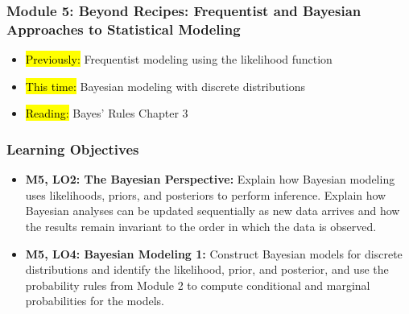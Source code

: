 
\begin{frame}
    \frametitle{Module 5: Beyond Recipes: Frequentist and Bayesian Approaches to Statistical Modeling}
    \begin{itemize}
        \item \hl{Previously: }Frequentist modeling using the likelihood function
        \item \hl{This time: }Bayesian modeling with discrete distributions
        \item \hl{Reading: }Bayes' Rules Chapter 3
    \end{itemize}

\end{frame}
\begin{frame}
    \frametitle{Learning Objectives}
    \begin{itemize}
        \item \textbf{M5, LO2: The Bayesian Perspective:} Explain how Bayesian modeling uses likelihoods, priors, and posteriors to perform inference. Explain how Bayesian analyses can be updated sequentially as new data arrives and how the results remain invariant to the order in which the data is observed.
        \item \textbf{M5, LO4: Bayesian Modeling 1:} Construct Bayesian models for discrete distributions and identify the likelihood, prior, and posterior, and use the probability rules from Module 2 to compute conditional and marginal probabilities for the models.
    \end{itemize}
\end{frame}
